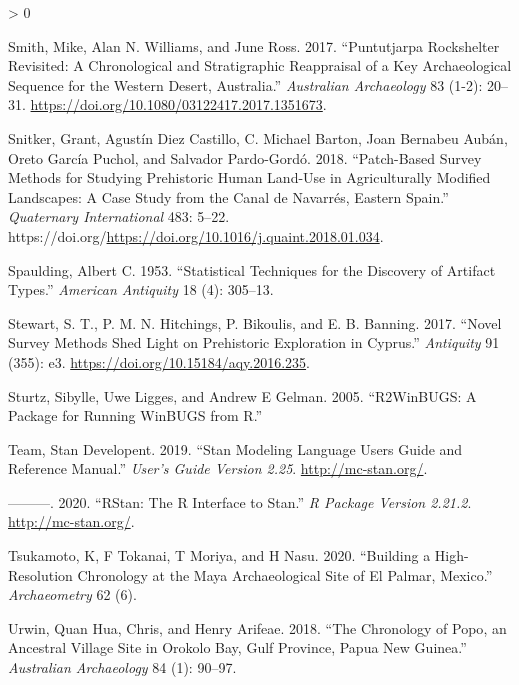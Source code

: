 \documentclass[
]{article}
\newlength{\cslhangindent}
\newenvironment{CSLReferences}[2] %
 {%
  \setlength{\parindent}{0pt}
  \ifodd #1 \everypar{\setlength{\hangindent}{\cslhangindent}}\ignorespaces\fi
  \ifnum #2 > 0
  \setlength{\parskip}{#2\baselineskip}
  \fi
 }%
 {}
\begin{document}
\begin{CSLReferences}{1}{0}
\leavevmode\hypertarget{ref-smith_puntutjarpa_2017}{}%
Smith, Mike, Alan N. Williams, and June Ross. 2017. {``Puntutjarpa
Rockshelter Revisited: A Chronological and Stratigraphic Reappraisal of
a Key Archaeological Sequence for the {Western} {Desert},
{Australia}.''} \emph{Australian Archaeology} 83 (1-2): 20--31.
\url{https://doi.org/10.1080/03122417.2017.1351673}.

\leavevmode\hypertarget{ref-snitker_patch-based_2018}{}%
Snitker, Grant, Agustín Diez Castillo, C. Michael Barton, Joan Bernabeu
Aubán, Oreto García Puchol, and Salvador Pardo-Gordó. 2018.
{``Patch-Based Survey Methods for Studying Prehistoric Human Land-Use in
Agriculturally Modified Landscapes: {A} Case Study from the {Canal} de
{Navarrés}, Eastern {Spain}.''} \emph{Quaternary International} 483:
5--22.
https://doi.org/\url{https://doi.org/10.1016/j.quaint.2018.01.034}.

\leavevmode\hypertarget{ref-spaulding_statistical_1953}{}%
Spaulding, Albert C. 1953. {``Statistical Techniques for the Discovery
of Artifact Types.''} \emph{American Antiquity} 18 (4): 305--13.

\leavevmode\hypertarget{ref-stewart_novel_2017}{}%
Stewart, S. T., P. M. N. Hitchings, P. Bikoulis, and E. B. Banning.
2017. {``Novel Survey Methods Shed Light on Prehistoric Exploration in
{Cyprus}.''} \emph{Antiquity} 91 (355): e3.
\url{https://doi.org/10.15184/aqy.2016.235}.

\leavevmode\hypertarget{ref-sturtz_r2winbugs_2005}{}%
Sturtz, Sibylle, Uwe Ligges, and Andrew E Gelman. 2005. {``{R2WinBUGS}:
A Package for Running {WinBUGS} from {R}.''}

\leavevmode\hypertarget{ref-team_rstan_2019}{}%
Team, Stan Developent. 2019. {``Stan Modeling Language Users Guide and
Reference Manual.''} \emph{User's Guide Version 2.25}.
\url{http://mc-stan.org/}.

\leavevmode\hypertarget{ref-team_rstan_2020}{}%
---------. 2020. {``{RStan}: The {R} Interface to {Stan}.''} \emph{R
Package Version 2.21.2}. \url{http://mc-stan.org/}.

\leavevmode\hypertarget{ref-tsukamoto_building_2020}{}%
Tsukamoto, K, F Tokanai, T Moriya, and H Nasu. 2020. {``Building a
High-Resolution Chronology at the {Maya} Archaeological Site of {El}
{Palmar}, {Mexico}.''} \emph{Archaeometry} 62 (6).

\leavevmode\hypertarget{ref-urwin_chronology_2018}{}%
Urwin, Quan Hua, Chris, and Henry Arifeae. 2018. {``The Chronology of
{Popo}, an Ancestral Village Site in {Orokolo} {Bay}, {Gulf} {Province},
{Papua} {New} {Guinea}.''} \emph{Australian Archaeology} 84 (1): 90--97.


\end{CSLReferences}
\end{document}
